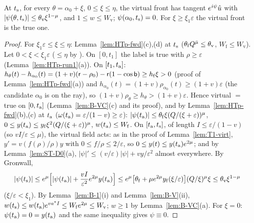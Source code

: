 \begin{lemma}\label{lem:HTp-virt}
At $t_{\mathrm s}$, for every $\theta=\alpha_0+\xi$, $0\le\xi\le\eta$, the virtual front has tangent $e^{i\psi}\hat u$ with
$|\psi(\theta,t_{\mathrm s})|\le\theta_{\mathrm v}\xi^{1-\mu}$, and $1\le w\le W_{\mathrm v}$; $\psi(\alpha_0,t_{\mathrm s})=0$. For $\xi\ge\xi_1\varepsilon$ the
virtual front is the true one.
\end{lemma}
\begin{proof}
For $\xi_1\varepsilon\le\xi\le\eta$: Lemma~\ref{lem:HTp-fwd}(c),(d) at $t_{\mathrm s}$ ($\theta_{\mathrm f}Q^{\bar\mu}\le\theta_{\mathrm v}$,
$W_{\mathrm f}\le W_{\mathrm v}$). Let $0<\xi<\xi_1\varepsilon$ ($\le\eta$ by ). On $[0,t_1]$ the label is true with $\rho\ge\varepsilon$
(Lemma~\ref{lem:HTp-run1}(a)). On $[t_1,t_{\mathrm a}]$: $h_\theta(t)-h_{\alpha_0}(t)=(1+v)(\mathsf r-\rho_0)-\mathsf r(1-\cos\mathsf b)\ge h_{\mathrm f}\xi>0$
(proof of Lemma~\ref{lem:HTp-fwd}(a)) and $h_{\alpha_0}(t)=(1+v)\rho_{\alpha_0}(t)\ge(1+v)\varepsilon$ (the candidate $\alpha_0$ is on the
ray), so $(1+v)\rho_\theta\ge h_\theta>(1+v)\varepsilon$. Hence virtual $=$ true on $[0,t_{\mathrm a}]$ (Lemma~\ref{lem:B-VC}(c) and its proof), and
by Lemma~\ref{lem:HTp-fwd}(b),(c) at $t_{\mathrm a}$ ($\omega(t_{\mathrm a})=\varepsilon/(1-v)\ge\varepsilon$):
$|\psi(t_{\mathrm a})|\le\theta_{\mathrm f}\xi(Q/(\xi+\varepsilon))^\mu$, $0\le y(t_{\mathrm a})\le y_{\mathrm f}\xi^2(Q/(\xi+\varepsilon))^\mu$,
$w(t_{\mathrm a})\le W_{\mathrm f}$. On $[t_{\mathrm a},t_{\mathrm s}]$, of length $I\le\varepsilon/(1-v)$ (so $vI/\varepsilon\le\mu$), the virtual field acts: as in the
proof of Lemma~\ref{lem:T1-virt}, $y'=v(f(\rho)/\rho)y$ with $0\le f/\rho\le2/\varepsilon$, so $0\le y(t)\le y(t_{\mathrm a})e^{2\mu}$; and by
Lemma~\ref{lem:ST-D0}(a), $|\psi|'\le(v/\varepsilon)|\psi|+vy/\varepsilon^2$ almost everywhere. By Gronwall,
\[
|\psi(t_{\mathrm s})|\le e^\mu\Bigl[|\psi(t_{\mathrm a})|+\frac{vI}{\varepsilon^2}e^{2\mu}y(t_{\mathrm a})\Bigr]\le e^\mu\bigl[\theta_{\mathrm f}+\mu e^{2\mu}y_{\mathrm f}
(\xi/\varepsilon)\bigr](Q/\xi)^\mu\xi\le\theta_{\mathrm v}\xi^{1-\mu}
\]
($\xi/\varepsilon<\xi_1$). By Lemma~\ref{lem:B-1}(i) and Lemma~\ref{lem:B-V}(ii), $w(t_{\mathrm s})\le w(t_{\mathrm a})e^{va^*I}\le W_{\mathrm f}e^{2\mu}\le
W_{\mathrm v}$; $w\ge1$ by Lemma~\ref{lem:B-VC}(a). For $\xi=0$: $\psi(t_{\mathrm a})=0=y(t_{\mathrm a})$ and the same inequality gives $\psi\equiv0$.
\end{proof}

